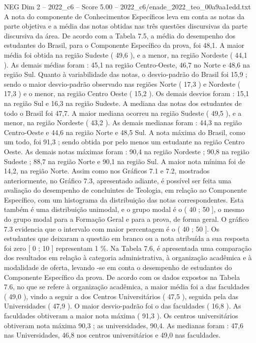\begin{textsample}{NEG Dim 2 – 2022\_c6 – Score 5.00 – 2022\_c6/enade\_2022\_teo\_00a9aa1edd.txt}
A nota do componente de Conhecimentos Específicos leva em conta as notas da parte objetiva e a média das notas obtidas nas três questões discursivas da parte discursiva da área.
De acordo com a Tabela 7.5, a média do desempenho dos estudantes do Brasil, para o Componente Específico da prova, foi 48,1.
A maior média foi obtida na região Sudeste ( 49,6 ), e a menor, na região Nordeste ( 44,1 ).
As demais médias foram : 45,1 na região Centro-Oeste, 46,7 no Norte e 48,6 na região Sul.
Quanto à variabilidade das notas, o desvio-padrão do Brasil foi 15,9 ; sendo o maior desvio-padrão observado nas regiões Norte ( 17,3 ) e Nordeste ( 17,3 ) e o menor, na região Centro Oeste ( 15,2 ).
Os demais desvios foram : 15,1 na região Sul e 16,3 na região Sudeste.
A mediana das notas dos estudantes de todo o Brasil foi 47,7.
A maior mediana ocorreu na região Sudeste ( 49,5 ), e a menor, na região Nordeste ( 43,2 ).
As demais medianas foram : 44,3 na região Centro-Oeste e 44,6 na região Norte e 48,5 Sul.
A nota máxima do Brasil, como um todo, foi 91,3 ; sendo obtida por pelo menos um estudante na região Centro Oeste.
As demais notas máximas foram : 90,4 na região Nordeste ; 90,8 na região Sudeste ; 88,7 na região Norte e 90,1 na região Sul.
A maior nota mínima foi de 14,2, na região Norte.
Assim como nos Gráficos 7.1 e 7.2, mostrados anteriormente, no Gráfico 7.3, apresentado adiante, é possível ser feita uma avaliação do desempenho de concluintes de Teologia, em relação ao Componente Específico, com um histograma da distribuição das notas correspondentes.
Esta também é uma distribuição unimodal, e o grupo modal é o ( 40 ; 50 ], o mesmo do grupo modal para a Formação Geral e para a prova, de forma geral.
O gráfico 7.3 evidencia que o intervalo com maior percentagem é o ( 40 ; 50 ].
Os estudantes que deixaram a questão em branco ou a nota atribuída a sua resposta foi zero [ 0 ; 10 ] representam 1 \%.
Na Tabela 7.6, é apresentada uma comparação dos resultados em relação à categoria administrativa, à organização acadêmica e à modalidade de oferta, levando -se em conta o desempenho de estudantes do Componente Específico da prova.
De acordo com os dados expostos na Tabela 7.6, no que se refere à organização acadêmica, a maior média foi a das faculdades ( 49,0 ), vindo a seguir a dos Centros Universitários ( 47,5 ), seguida pela das Universidades ( 47,9 ).
O maior desvio-padrão foi o das faculdades ( 16,8 ).
As faculdades obtiveram a maior nota máxima ( 91,3 ).
Os centros universitários obtiveram nota máxima 90,3 ; as universidades, 90,4.
As medianas foram : 47,6 nas Universidades, 46,8 nos centros universitários e 49,0 nas faculdades.

\end{textsample}
